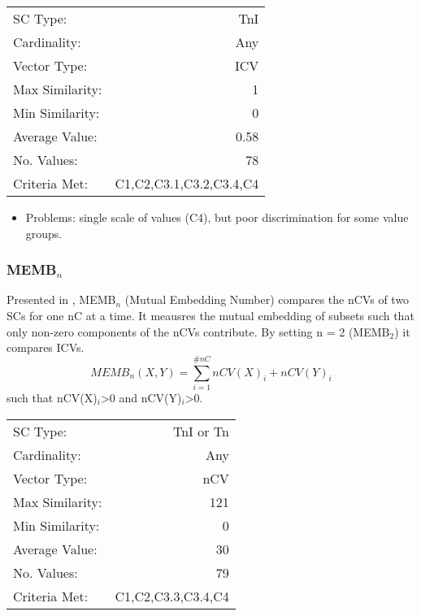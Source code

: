 \documentclass{article}
\begin{document}
\begin{center}
\begin{tabular}{lr}
 SC Type:         &                      TnI  \\
 Cardinality:     &                      Any  \\
 Vector Type:     &                      ICV  \\
 Max Similarity:  &                        1  \\
 Min Similarity:  &                        0  \\
 Average Value:   &                     0.58  \\
 No. Values:      &                       78  \\
 Criteria Met:    &  C1,C2,C3.1,C3.2,C3.4,C4  \\
\end{tabular}
\end{center}


\begin{itemize}
\item Problems: single scale of values (C4), but poor discrimination for
  some value groups.
\end{itemize}
\subsubsection{MEMB$_{n}$}
\label{sec-11-5-2}

Presented in \citet[pp. 492]{Rahn1979}, MEMB$_{n}$ (Mutual Embedding
Number) compares the nCVs of two SCs for one nC at a time. It meausres
the mutual embedding of subsets such that only non-zero components of
the nCVs contribute. By setting n = 2 (MEMB$_{2}$) it compares ICVs.
$$MEMB_{n}\left(X,Y\right)=\sum_{i=1}^{\#nC}{nCV(X)_{i}+nCV(Y)_{i}}$$
such that nCV(X)$_{i}$>0 and nCV(Y)$_{i}$>0. 

\begin{center}
\begin{tabular}{lr}
 SC Type:         &           TnI or Tn  \\
 Cardinality:     &                 Any  \\
 Vector Type:     &                 nCV  \\
 Max Similarity:  &                 121  \\
 Min Similarity:  &                   0  \\
 Average Value:   &                  30  \\
 No. Values:      &                  79  \\
 Criteria Met:    &  C1,C2,C3.3,C3.4,C4  \\
\end{tabular}
\end{center}
\end{document}
